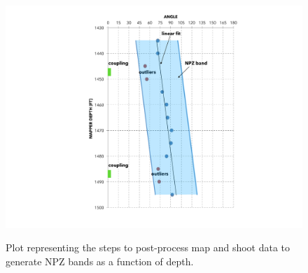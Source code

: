 \documentclass[paper=a4, fontsize=11pt]{scrartcl}
\numberwithin{equation}{section}		%
\numberwithin{figure}{section}			%
\numberwithin{table}{section}				%
\begin{document}
\begin{figure}[h!]
    \caption{Plot representing the steps to post-process map and shoot data to generate NPZ bands as a function of depth.}
    \centering
    \includegraphics[width=1.0\textwidth]{figures/map_shoot.pdf}
    \label{fig:map_shoot}
\end{figure}
\end{document}

